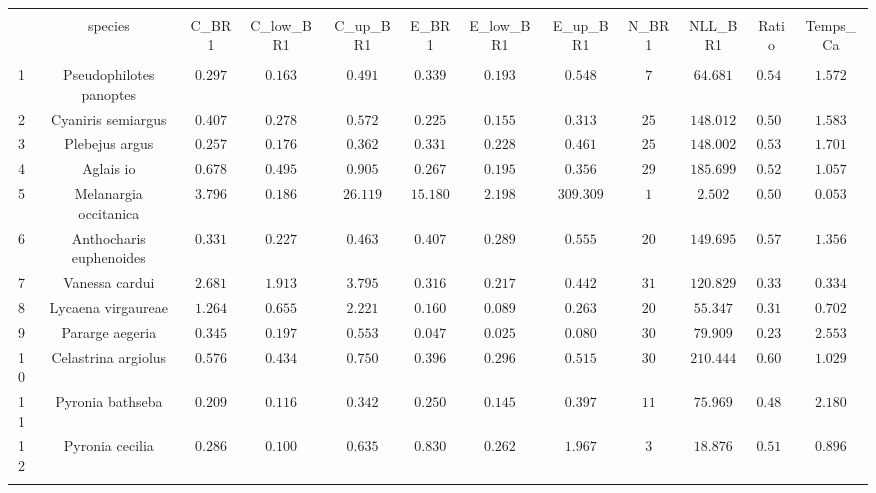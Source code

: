 
\begin{table}[!htbp] \centering 
  \caption{} 
  \label{} 
\begin{tabular}{@{\extracolsep{5pt}} cccccccccccc} 
\\[-1.8ex]\hline 
\hline \\[-1.8ex] 
 & species & C\_BR1 & C\_low\_BR1 & C\_up\_BR1 & E\_BR1 & E\_low\_BR1 & E\_up\_BR1 & N\_BR1 & NLL\_BR1 & Ratio & Temps\_Ca \\ 
\hline \\[-1.8ex] 
1 & Pseudophilotes panoptes & $0.297$ & $0.163$ & $0.491$ & $0.339$ & $0.193$ & $0.548$ & $7$ & $64.681$ & $0.548$ & $1.572$ \\ 
2 & Cyaniris semiargus & $0.407$ & $0.278$ & $0.572$ & $0.225$ & $0.155$ & $0.313$ & $25$ & $148.012$ & $0.509$ & $1.583$ \\ 
3 & Plebejus argus & $0.257$ & $0.176$ & $0.362$ & $0.331$ & $0.228$ & $0.461$ & $25$ & $148.002$ & $0.530$ & $1.701$ \\ 
4 & Aglais io & $0.678$ & $0.495$ & $0.905$ & $0.267$ & $0.195$ & $0.356$ & $29$ & $185.699$ & $0.526$ & $1.057$ \\ 
5 & Melanargia occitanica & $3.796$ & $0.186$ & $26.119$ & $15.180$ & $2.198$ & $309.309$ & $1$ & $2.502$ & $0.500$ & $0.053$ \\ 
6 & Anthocharis euphenoides & $0.331$ & $0.227$ & $0.463$ & $0.407$ & $0.289$ & $0.555$ & $20$ & $149.695$ & $0.576$ & $1.356$ \\ 
7 & Vanessa cardui & $2.681$ & $1.913$ & $3.795$ & $0.316$ & $0.217$ & $0.442$ & $31$ & $120.829$ & $0.337$ & $0.334$ \\ 
8 & Lycaena virgaureae & $1.264$ & $0.655$ & $2.221$ & $0.160$ & $0.089$ & $0.263$ & $20$ & $55.347$ & $0.316$ & $0.702$ \\ 
9 & Pararge aegeria & $0.345$ & $0.197$ & $0.553$ & $0.047$ & $0.025$ & $0.080$ & $30$ & $79.909$ & $0.230$ & $2.553$ \\ 
10 & Celastrina argiolus & $0.576$ & $0.434$ & $0.750$ & $0.396$ & $0.296$ & $0.515$ & $30$ & $210.444$ & $0.605$ & $1.029$ \\ 
11 & Pyronia bathseba & $0.209$ & $0.116$ & $0.342$ & $0.250$ & $0.145$ & $0.397$ & $11$ & $75.969$ & $0.481$ & $2.180$ \\ 
12 & Pyronia cecilia & $0.286$ & $0.100$ & $0.635$ & $0.830$ & $0.262$ & $1.967$ & $3$ & $18.876$ & $0.510$ & $0.896$ \\ 
\hline \\[-1.8ex] 
\end{tabular} 
\end{table} 
